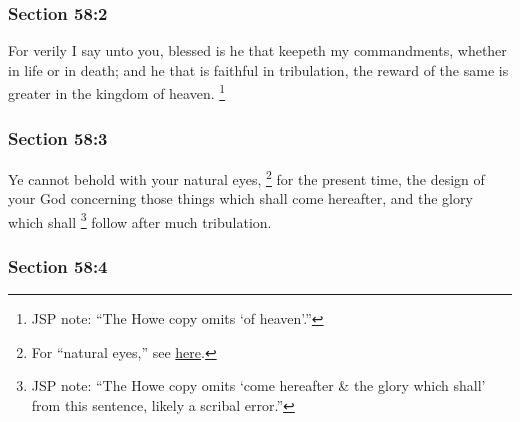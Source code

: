	\subsubsection{Section 58:2} %
		\label{DC58-2}

		For verily I say unto you, blessed is he that keepeth my commandments, whether in life or in death; and he that is faithful in tribulation, the reward of the same is greater in the kingdom of heaven.%
			\footnote{%
				JSP note: ``The Howe copy omits `of heaven'.''
				}


	\subsubsection{Section 58:3} %
		\label{DC58-3}

		Ye cannot behold with your natural eyes,%
			\footnote{%
				For ``natural eyes,'' see \hyperref[NATURAL-PHRASES]{here}.
				}
		for the present time, the design of your God concerning those things which shall come hereafter, and the glory which shall%
			\footnote{%
				JSP note: ``The Howe copy omits `come hereafter \& the glory which shall' from this sentence, likely a scribal error.''
				}
		follow after much tribulation.


	\subsubsection{Section 58:4} %
		\label{DC58-4}

